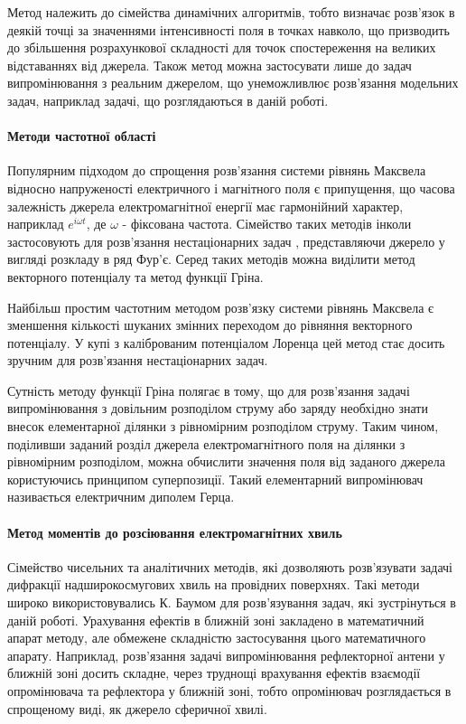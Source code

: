Метод належить до сімейства динамічних алгоритмів, тобто визначає розв'язок 
в деякій точці за значеннями інтенсивності поля в точках навколо, що 
призводить до збільшення розрахункової складності для точок спостереження на 
великих відставаннях від джерела. Також метод можна застосувати лише до 
задач випромінювання з реальним джерелом, що унеможливлює розв'язання 
модельних задач, наприклад задачі, що розглядаються в даній роботі.

\paragraph{Методи частотної області}

Популярним підходом до спрощення розв'язання системи рівнянь Максвела відносно
напруженості електричного і магнітного поля є припущення, що часова залежність 
джерела електромагнітної енергії має гармонійний характер, наприклад 
$ e^{i \omega t} $, де $ \omega $ - фіксована частота. Сімейство таких 
методів \cite{imp:Shubarin1960} інколи застосовують для розв'язання 
нестаціонарних задач \cite{imp:Harmuth1981}, представляючи джерело у вигляді 
розкладу в ряд Фур'є. Серед таких методів можна виділити метод векторного 
потенціалу та метод функції Гріна.

Найбільш простим частотним методом розв'язку системи рівнянь Максвела є 
зменшення кількості шуканих змінних переходом до рівняння векторного 
потенціалу. У купі з каліброваним потенціалом Лоренца цей метод стає досить 
зручним для розв'язання нестаціонарних задач.

Сутність методу функції Гріна полягає в тому, що для розв'язання задачі 
випромінювання з довільним розподілом струму або заряду необхідно знати 
внесок елементарної ділянки з рівномірним розподілом струму. Таким чином, 
поділивши заданий розділ джерела електромагнітного поля на ділянки з 
рівномірним розподілом, можна обчислити значення поля від заданого джерела 
користуючись принципом суперпозиції. Такий елементарний випромінювач 
називається електричним диполем Герца.

\paragraph{Метод моментів до розсіювання електромагнітних хвиль}

Сімейство чисельних та аналітичних методів, які дозволяють розв'язувати
задачі дифракції надширокосмугових хвиль на провідних поверхнях.
Такі методи широко використовувались К. Баумом для розв'язування задач, які 
зустрінуться в даній роботі. Урахування ефектів в ближній зоні закладено в
математичний апарат методу, але обмежене складністю застосування цього 
математичного апарату. Наприклад, розв'язання задачі випромінювання 
рефлекторної антени у ближній зоні досить складне, через труднощі врахування 
ефектів взаємодії опромінювача та рефлектора у ближній зоні, тобто 
опромінювач розглядається в спрощеному виді, як джерело сферичної хвилі.

